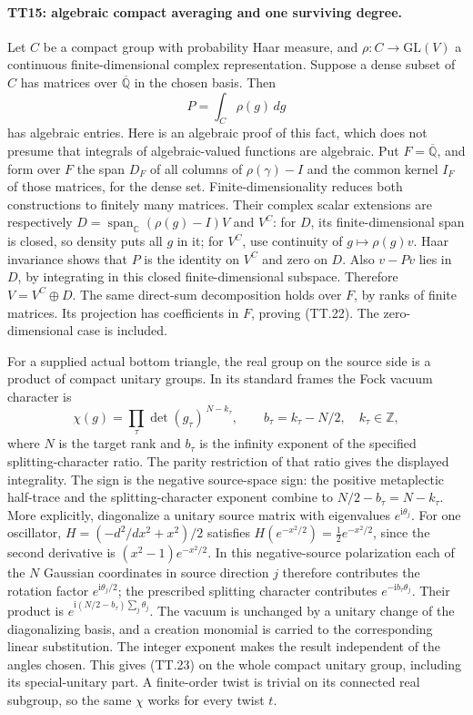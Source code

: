 \paragraph{TT15: algebraic compact averaging and one surviving degree.}
Let $C$ be a compact group with probability Haar measure, and
$\rho:C\to\mathrm{GL}(V)$ a continuous finite-dimensional
complex representation. Suppose a dense subset of $C$ has
matrices over $\overline{\mathbb Q}$ in the chosen basis. Then
\[
                         P=\int_C\rho(g)\,dg               \tag{TT.22}
\]
has algebraic entries. Here is an algebraic proof of this fact,
which does not presume that integrals of algebraic-valued
functions are algebraic. Put $F=\overline{\mathbb Q}$, and form
over $F$ the span $D_F$ of all columns of $\rho(\gamma)-I$ and
the common kernel $I_F$ of those matrices, for the dense set.
Finite-dimensionality reduces both constructions to finitely many
matrices. Their complex scalar extensions are respectively
$D=\operatorname{span}_{\mathbb C}(\rho(g)-I)V$ and $V^C$:
for $D$, its finite-dimensional span is closed, so density puts
all $g$ in it; for $V^C$, use continuity of $g\mapsto\rho(g)v$.
Haar invariance shows that $P$ is the identity on $V^C$ and zero
on $D$. Also $v-Pv$ lies in $D$, by integrating in this closed
finite-dimensional subspace. Therefore
$V=V^C\oplus D$. The same direct-sum decomposition holds over
$F$, by ranks of finite matrices. Its projection has coefficients
in $F$, proving (TT.22). The zero-dimensional case is included.

For a supplied actual bottom triangle, the real group on the
source side is a product of compact unitary groups. In its
standard frames the Fock vacuum character is
\[
            \chi(g)=\prod_\tau\det(g_\tau)^{\,N-k_\tau},
       \qquad b_\tau=k_\tau-N/2,\quad k_\tau\in\mathbb Z,
                                                                  \tag{TT.23}
\]
where $N$ is the target rank and $b_\tau$ is the infinity
exponent of the specified splitting-character ratio. The parity
restriction of that ratio gives the displayed integrality.
The sign is the negative source-space sign: the positive
metaplectic half-trace and the splitting-character exponent
combine to $N/2-b_\tau=N-k_\tau$. More explicitly, diagonalize a
unitary source matrix with eigenvalues $e^{\mathrm i\theta_j}$.
For one oscillator,
$H=(-d^2/dx^2+x^2)/2$ satisfies
$H(e^{-x^2/2})=\tfrac12e^{-x^2/2}$, since the second derivative
is $(x^2-1)e^{-x^2/2}$. In this negative-source polarization each
of the $N$ Gaussian coordinates in source direction $j$ therefore
contributes the rotation factor $e^{\mathrm i\theta_j/2}$; the
prescribed splitting character contributes
$e^{-\mathrm i b_\tau\theta_j}$.
Their product is $e^{\mathrm i(N/2-b_\tau)\sum_j\theta_j}$.
The vacuum is unchanged by a unitary change of the diagonalizing
basis, and a creation monomial is carried to the corresponding
linear substitution. The integer exponent makes the result
independent of the angles chosen. This gives (TT.23) on the
whole compact unitary group, including its special-unitary part. A
finite-order twist is trivial on its connected real subgroup, so
the same $\chi$ works for every twist $t$.

